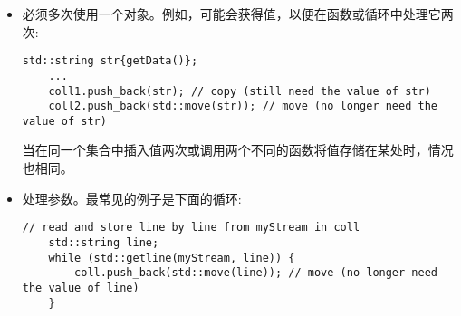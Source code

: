 \begin{itemize}
	\item 必须多次使用一个对象。例如，可能会获得值，以便在函数或循环中处理它两次:\par
	\begin{lstlisting}[caption={}]
	std::string str{getData()};
	...
	coll1.push_back(str); // copy (still need the value of str)
	coll2.push_back(std::move(str)); // move (no longer need the value of str)
	\end{lstlisting}
	当在同一个集合中插入值两次或调用两个不同的函数将值存储在某处时，情况也相同。
	\item 处理参数。最常见的例子是下面的循环:\par
	\begin{lstlisting}[caption={}]
	// read and store line by line from myStream in coll
	std::string line;
	while (std::getline(myStream, line)) {
		coll.push_back(std::move(line)); // move (no longer need the value of line)
	}
	\end{lstlisting}
\end{itemize}








